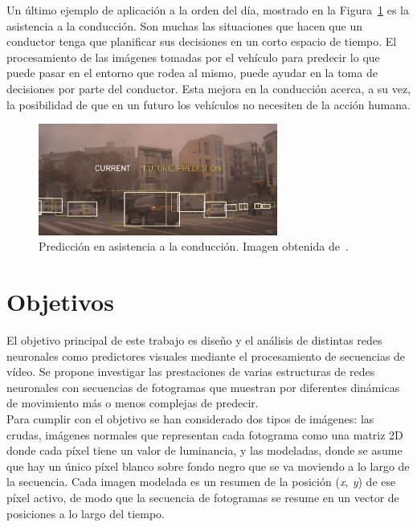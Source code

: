 Un último ejemplo de aplicación a la orden del día, mostrado en la Figura~\ref{fig.drive} es la asistencia a la conducción. Son muchas las situaciones que hacen que un conductor tenga que planificar sus decisiones en un corto espacio de tiempo. El procesamiento de las imágenes tomadas por el vehículo para predecir lo que puede pasar en el entorno que rodea al mismo, puede ayudar en la toma de decisiones por parte del conductor. Esta mejora en la conducción acerca, a su vez, la posibilidad de que en un futuro los vehículos no necesiten de la acción humana.
\vspace{5pt}
\begin{figure}[H]
	\begin{center}
		\includegraphics[width=0.7\textwidth]{ figures/intro/drive.png}
		\caption{Predicción en asistencia a la conducción. Imagen obtenida de~\cite{drive}.
		}
		\label{fig.drive}
	\end{center}
\end{figure}
\vspace{-10pt}

\section{Objetivos} \label{sec.obj}
El objetivo principal de este trabajo es diseño y el análisis de distintas redes neuronales como predictores visuales mediante el procesamiento de secuencias de vídeo. Se propone investigar las prestaciones de varias estructuras de redes neuronales con secuencias de fotogramas que muestran por diferentes dinámicas de movimiento más o menos complejas de predecir.\\

Para cumplir con el objetivo se han considerado dos tipos de imágenes: las crudas, imágenes normales que representan cada fotograma como una matriz 2D donde cada píxel tiene un valor de luminancia, y las modeladas, donde se asume que hay un único píxel blanco sobre fondo negro que se va moviendo a lo largo de la secuencia. Cada imagen modelada es un resumen de la posición (\textit{x, y}) de ese píxel activo, de modo que la secuencia de fotogramas se resume en un vector de posiciones a lo largo del tiempo.\\

